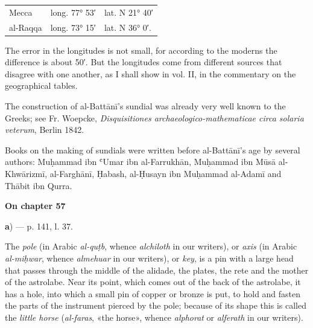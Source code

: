 \documentclass[11pt]{article}
\newcommand{\UnitHead}[2]{\par\setcounter{footnoteT}{0}\needspace{8\baselineskip}\bigskip\pdfbookmark[1]{#1}{unit-#2}\hypertarget{EN-#2}{}%
 {\large\bfseries\interlinepenalty=10000 #1\par}\nobreak\medskip}
\begin{document}
\begin{center}\small\begin{tabular}{lll}
Mecca & long. 77° 53′ & lat. N 21° 40′ \\
al-Raqqa & long. 73° 15′ & lat. N 36° 0′. \\
\end{tabular}\end{center}
\par The error in the longitudes is not small, for according to the moderns the difference is about 50′. But the longitudes come from different sources that disagree with one another, as I shall show in vol. II, in the commentary on the geographical tables.\par
\par The construction of al-Battānī's sundial was already very well known to the Greeks; see Fr. Woepcke, \emph{Disquisitiones archaeologico-mathematicae circa solaria veterum}, Berlin 1842.\par
\par Books on the making of sundials were written before al-Battānī's age by several authors: Muḥammad ibn ʿUmar ibn al-Farrukhān, Muḥammad ibn Mūsā al-Khwārizmī, al-Farghānī, Ḥabash, al-Ḥusayn ibn Muḥammad al-Adamī and Thābit ibn Qurra.\par
\UnitHead{On chapter 57}{A57}
\par\begin{center}\textbf{a}) — p. 141, l. 37.\end{center}
\par The \emph{pole} (in Arabic \emph{al-quṭb}, whence \emph{alchiloth} in our writers), or \emph{axis} (in Arabic \emph{al-miḥwar}, whence \emph{almehuar} in our writers), or \emph{key}, is a pin with a large head that passes through the middle of the alidade, the plates, the rete and the mother of the astrolabe. Near its point, which comes out of the back of the astrolabe, it has a hole, into which a small pin of copper or bronze is put, to hold and fasten the parts of the instrument pierced by the pole; because of its shape this is called the \emph{little horse} (\emph{al-faras}, «the horse», whence \emph{alphorat} or \emph{alferath} in our writers).\par
\begin{center}\end{center}
\end{document}
